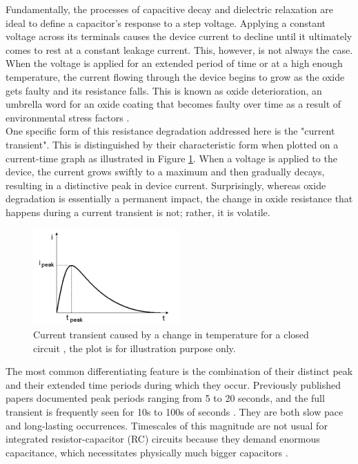 Fundamentally, the processes of capacitive decay and dielectric relaxation are ideal to define a capacitor's response to a step voltage. Applying a constant voltage across its terminals causes the device current to decline until it ultimately comes to rest at a constant leakage current. This, however, is not always the case. When the voltage is applied for an extended period of time or at a high enough temperature, the current flowing through the device begins to grow as the oxide gets faulty and its resistance falls. This is known as oxide deterioration, an umbrella word for an oxide coating that becomes faulty over time as a result of environmental stress factors \cite{ghibaudo1999emerging}. \\

\noindent One specific form of this resistance degradation addressed here is the "current transient". This is distinguished by their characteristic form when plotted on a current-time graph as illustrated in Figure \ref{fig:4a}. When a voltage is applied to the device, the current grows swiftly to a maximum and then gradually decays, resulting in a distinctive peak in device current. Surprisingly, whereas oxide degradation is essentially a permanent impact, the change in oxide resistance that happens during a current transient is not; rather, it is volatile. \\

\begin{figure}[htbp!] 
    \centering    
    \includegraphics[width=0.5\textwidth]{Chapter4/Figs/a.png}
    \caption[Current transients illustration]{Current transient caused by a change in temperature for a closed circuit \cite{zafar2011measurement}, the plot is for illustration purpose only.}
    \label{fig:4a}
\end{figure}

\noindent The most common differentiating feature is the combination of their distinct peak and their extended time periods during which they occur. Previously published papers documented peak periods ranging from 5 to 20 seconds, and the full transient is frequently seen for 10s to 100s of seconds \cite{saha2001transient}. They are both slow pace and long-lasting occurrences. Timescales of this magnitude are not usual for integrated resistor-capacitor (RC) circuits because they demand enormous capacitance, which necessitates physically much bigger capacitors \cite{el2006space}. \\


